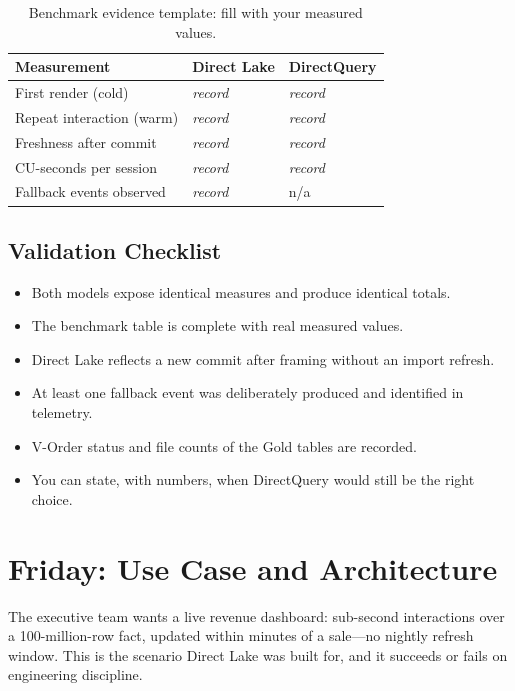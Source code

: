 \begin{table}[H]
\centering
\small
\begin{tabular}{@{}p{4.6cm}p{3.6cm}p{3.6cm}@{}}
\toprule
\textbf{Measurement} & \textbf{Direct Lake} & \textbf{DirectQuery} \\
\midrule
First render (cold) & \emph{record} & \emph{record} \\
Repeat interaction (warm) & \emph{record} & \emph{record} \\
Freshness after commit & \emph{record} & \emph{record} \\
CU-seconds per session & \emph{record} & \emph{record} \\
Fallback events observed & \emph{record} & n/a \\
\bottomrule
\end{tabular}
\caption{Benchmark evidence template: fill with your measured values.}
\label{tab:chapter8-benchmark}
\end{table}

\subsection{Validation Checklist}
\begin{itemize}
    \item Both models expose identical measures and produce identical totals.
    \item The benchmark table is complete with real measured values.
    \item Direct Lake reflects a new commit after framing without an import refresh.
    \item At least one fallback event was deliberately produced and identified in telemetry.
    \item V-Order status and file counts of the Gold tables are recorded.
    \item You can state, with numbers, when DirectQuery would still be the right choice.
\end{itemize}

\section{Friday: Use Case and Architecture}
The executive team wants a live revenue dashboard: sub-second interactions over a 100-million-row fact, updated within minutes of a sale---no nightly refresh window. This is the scenario Direct Lake was built for, and it succeeds or fails on engineering discipline.


